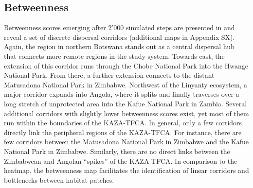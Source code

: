 \documentclass[abstract=on,10pt,a4paper,bibliography=totocnumbered]{article}
\begin{document}
\subsection{Betweenness}
Betweenness scores emerging after 2'000 simulated steps are presented in
 and reveal a set of discrete dispersal corridors (additional
maps in Appendix SX). Again, the region in northern Botswana stands out as a
central dispersal hub that connects more remote regions in the study system.
Towards east, the extension of this corridor runs through the Chobe National
Park into the Hwange National Park. From there, a further extension connects to
the distant Matusadona National Park in Zimbabwe. Northwest of the Linyanty
ecosystem, a major corridor expands into Angola, where it splits and finally
traverses over a long stretch of unprotected area into the Kafue National Park
in Zambia. Several additional corridors with slightly lower betweenness scores
exist, yet most of them run within the boundaries of the KAZA-TFCA. In general,
only a few corridors directly link the peripheral regions of the KAZA-TFCA. For
instance, there are few corridors between the Matusadona National Park in
Zimbabwe and the Kafue National Park in Zimbabwe. Similarly, there are no direct
links between the Zimbabwean and Angolan ``spikes'' of the KAZA-TFCA. In
comparison to the heatmap, the betweenness map facilitates the identification of
linear corridors and bottlenecks between habitat patches.
\end{document}

